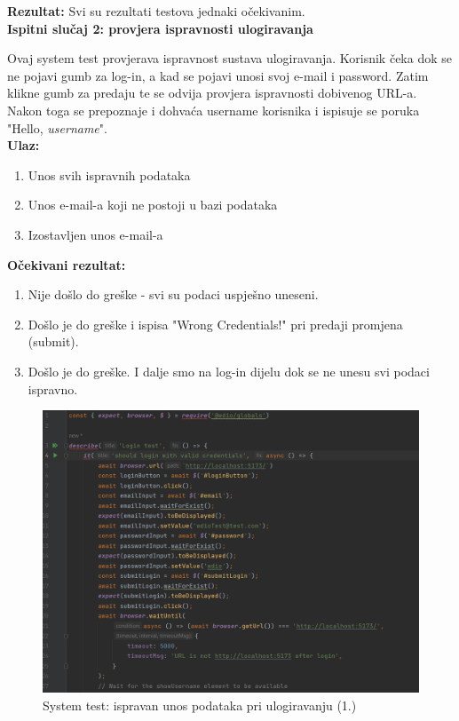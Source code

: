 			\textbf{Rezultat:}
			Svi su rezultati testova jednaki očekivanim.\\
			
			\textbf{Ispitni slučaj 2: provjera ispravnosti ulogiravanja}
			
			Ovaj system test provjerava ispravnost sustava ulogiravanja. Korisnik čeka dok se ne pojavi gumb za log-in, a kad se pojavi unosi svoj e-mail i password. Zatim klikne gumb za predaju te se odvija provjera ispravnosti dobivenog URL-a. Nakon toga se prepoznaje i dohvaća username korisnika i ispisuje se poruka "Hello, \textit{username}". \\
			
			\textbf{Ulaz:}
			
				\begin{enumerate}
					\item Unos svih ispravnih podataka
					\item Unos e-mail-a koji ne postoji u bazi podataka
					\item Izostavljen unos e-mail-a
				\end{enumerate}
				
			\textbf{Očekivani rezultat:}
			
				\begin{enumerate}
					\item Nije došlo do greške - svi su podaci uspješno uneseni.
					\item Došlo je do greške i ispisa "Wrong Credentials!" pri predaji promjena (submit).
					\item Došlo je do greške. I dalje smo na log-in dijelu dok se ne unesu svi podaci ispravno.
				\end{enumerate}
			
			\begin{figure}[H]
				\includegraphics[scale=0.7]{slike/syslogin1.PNG} 
				\centering
				\caption{System test: ispravan unos podataka pri ulogiravanju (1.)}
				\label{syslogin1}
			\end{figure}
			
